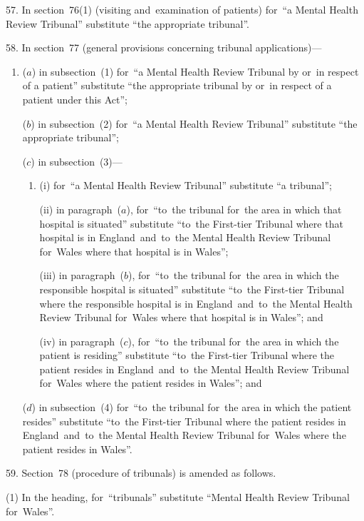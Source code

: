 \documentclass[12pt,a4paper]{article}
\begin{document}
\medskip

57.  In section~76(1) (visiting and~examination of patients) for~“a Mental Health Review Tribunal” substitute “the appropriate tribunal”.

\medskip

58.  In section~77 (general provisions concerning tribunal applications)—
\begin{enumerate}\item[]
($a$) in subsection~(1) for~“a Mental Health Review Tribunal by or~in respect of a patient” substitute “the appropriate tribunal by or~in respect of a patient under this Act”;

($b$) in subsection~(2) for~“a Mental Health Review Tribunal” substitute “the appropriate tribunal”;

($c$) in subsection~(3)—
\begin{enumerate}\item[]
(i) for~“a Mental Health Review Tribunal” substitute “a tribunal”;

(ii) in paragraph~($a$), for~“to~the tribunal for~the area in which that hospital is situated” substitute “to~the First-tier Tribunal where that hospital is in England~and~to~the Mental Health Review Tribunal for~Wales where that hospital is in Wales”;

(iii) in paragraph~($b$), for~“to~the tribunal for~the area in which the responsible hospital is situated” substitute “to~the First-tier Tribunal where the responsible hospital is in England~and~to~the Mental Health Review Tribunal for~Wales where that hospital is in Wales”; and

(iv)  in paragraph~($c$), for~“to~the tribunal for~the area in which the patient is residing” substitute “to~the First-tier Tribunal where the patient resides in England~and~to~the Mental Health Review Tribunal for~Wales where the patient resides in Wales”; and
\end{enumerate}

($d$) in subsection~(4) for~“to~the tribunal for~the area in which the patient resides” substitute “to~the First-tier Tribunal where the patient resides in England~and~to~the Mental Health Review Tribunal for~Wales where the patient resides in Wales”.
\end{enumerate}

\medskip

59.  Section~78 (procedure of tribunals) is amended as follows.

(1) In the heading, for~“tribunals” substitute “Mental Health Review Tribunal for~Wales”.
\end{document}
